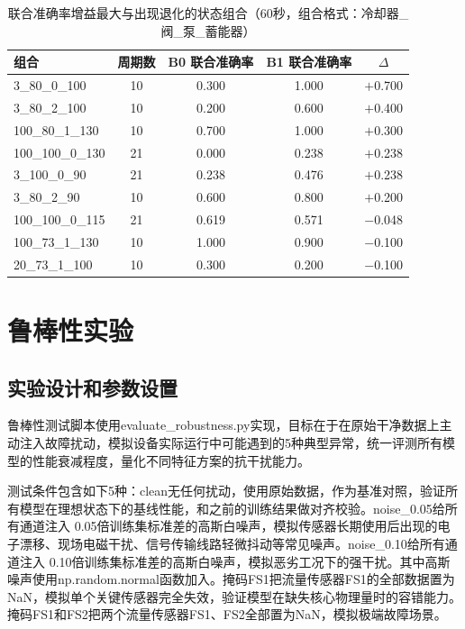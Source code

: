 \documentclass[12pt, a4paper]{ctexart}
\begin{document}
\begin{table}[H]
  \centering
  \caption{联合准确率增益最大与出现退化的状态组合（60秒，组合格式：冷却器\_阀\_泵\_蓄能器）}
  \label{tab:improve_by_group}
  \small
  \begin{tabular}{lcccc}
    \toprule
    \textbf{组合} & \textbf{周期数} & \textbf{B0 联合准确率} & \textbf{B1 联合准确率} & \textbf{$\Delta$} \\
    \midrule
    3\_80\_0\_100    & 10 & 0.300 & 1.000 & $+$0.700 \\
    3\_80\_2\_100    & 10 & 0.200 & 0.600 & $+$0.400 \\
    100\_80\_1\_130  & 10 & 0.700 & 1.000 & $+$0.300 \\
    100\_100\_0\_130 & 21 & 0.000 & 0.238 & $+$0.238 \\
    3\_100\_0\_90    & 21 & 0.238 & 0.476 & $+$0.238 \\
    3\_80\_2\_90     & 10 & 0.600 & 0.800 & $+$0.200 \\
    \midrule
    100\_100\_0\_115 & 21 & 0.619 & 0.571 & $-$0.048 \\
    100\_73\_1\_130  & 10 & 1.000 & 0.900 & $-$0.100 \\
    20\_73\_1\_100   & 10 & 0.300 & 0.200 & $-$0.100 \\
    \bottomrule
  \end{tabular}
\end{table}

\section{鲁棒性实验}
\subsection{实验设计和参数设置}
鲁棒性测试脚本使用evaluate\_robustness.py实现，目标在于在原始干净数据上主动注入故障扰动，模拟设备实际运行中可能遇到的5种典型异常，统一评测所有模型的性能衰减程度，量化不同特征方案的抗干扰能力。

测试条件包含如下5种：clean无任何扰动，使用原始数据，作为基准对照，验证所有模型在理想状态下的基线性能，和之前的训练结果做对齐校验。noise\_0.05给所有通道注入 0.05倍训练集标准差的高斯白噪声，模拟传感器长期使用后出现的电子漂移、现场电磁干扰、信号传输线路轻微抖动等常见噪声。noise\_0.10给所有通道注入 0.10倍训练集标准差的高斯白噪声，模拟恶劣工况下的强干扰。其中高斯噪声使用np.random.normal函数加入。掩码FS1把流量传感器FS1的全部数据置为NaN，模拟单个关键传感器完全失效，验证模型在缺失核心物理量时的容错能力。掩码FS1和FS2把两个流量传感器FS1、FS2全部置为NaN，模拟极端故障场景。
\end{document}
